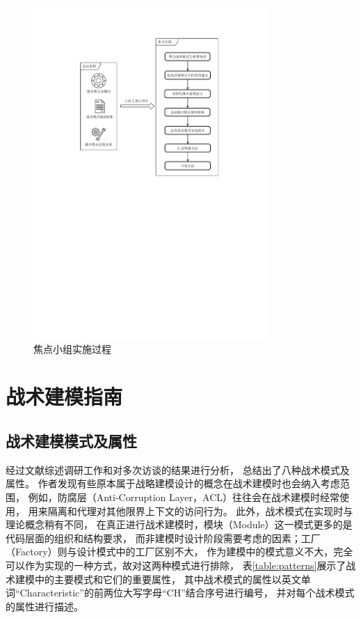 \begin{figure}[!htbp] %
    \centering %
    \includegraphics[width=0.8\textwidth]{FIGs/chapter3/focusgroup.pdf} %
    \caption{焦点小组实施过程} %
    \label{focusgroup} %
\end{figure}%

\section{战术建模指南}

\subsection{战术建模模式及属性}

经过文献综述调研工作和对多次访谈的结果进行分析，
总结出了八种战术模式及属性。
作者发现有些原本属于战略建模设计的概念在战术建模时也会纳入考虑范围，
例如，防腐层（Anti-Corruption Layer，ACL）往往会在战术建模时经常使用，
用来隔离和代理对其他限界上下文的访问行为。
此外，战术模式在实现时与理论概念稍有不同，
在真正进行战术建模时，模块（Module）这一模式更多的是代码层面的组织和结构要求，
而非建模时设计阶段需要考虑的因素；工厂（Factory）则与设计模式中的工厂区别不大，
作为建模中的模式意义不大，完全可以作为实现的一种方式，故对这两种模式进行排除，
表\ref{table:patterns}展示了战术建模中的主要模式和它们的重要属性，
其中战术模式的属性以英文单词“Characteristic”的前两位大写字母“CH”结合序号进行编号，
并对每个战术模式的属性进行描述。


